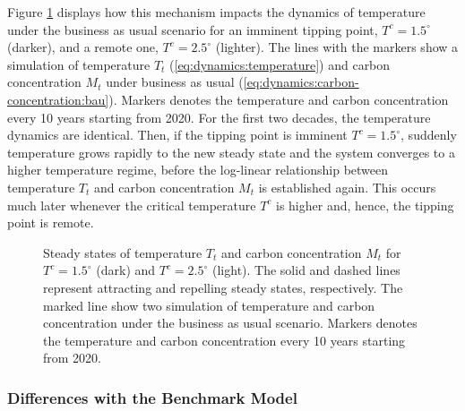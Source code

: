 \documentclass[../../main.tex]{subfiles}
\begin{document}
Figure \ref{fig:nullclines} displays how this mechanism impacts the dynamics of temperature under the business as usual scenario for an imminent tipping point, $T^c = 1.5^\circ$ (darker), and a remote one, $T^c = 2.5^\circ$ (lighter). The lines with the markers show a simulation of temperature $T_t$ (\ref{eq:dynamics:temperature}) and carbon concentration $M_t$ under business as usual (\ref{eq:dynamics:carbon-concentration:bau}). Markers denotes the temperature and carbon concentration every 10 years starting from 2020. For the first two decades, the temperature dynamics are identical. Then, if the tipping point is imminent $T^c = 1.5^\circ$, suddenly temperature grows rapidly to the new steady state and the system converges to a higher temperature regime, before the log-linear relationship between temperature $T_t$ and carbon concentration $M_t$ is established again. This occurs much later whenever the critical temperature $T^c$ is higher and, hence, the tipping point is remote. \begin{figure}[htbp]
    \centering
    
    \caption{Steady states of temperature $T_t$ and carbon concentration $M_t$ for $T^c = 1.5^\circ$ (dark) and $T^c = 2.5^\circ$ (light). The solid and dashed lines represent attracting and repelling steady states, respectively. The marked line show two simulation of temperature and carbon concentration under the business as usual scenario. Markers denotes the temperature and carbon concentration every 10 years starting from 2020.}
    \label{fig:nullclines}
\end{figure}

\subsubsection{Differences with the Benchmark Model}

\end{document}
